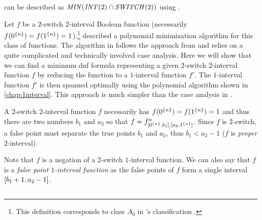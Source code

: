 can be described as
$\mathit{MIN} (\mathit{INT} (2) \cap \mathit{SWITCH} (2))$
using
.

Let $f$ be a $2$-switch $2$-interval Boolean function
(necessarily $f(0^{\{n\}}) = f(1^{\{n\}})
= 1$).\footnote{This definition corresponds to class $A_0$
in \citeauthor{Dubovsky2012}'s classification
\citep[p.~5]{Dubovsky2012}.}
\citeauthor{Dubovsky2012} described a polynomial minimization algorithm for this class of functions.
The algorithm in \citet[p.~17]{Dubovsky2012}
follows the approach from \citet{Schieber2005154}
and relies on a quite complicated and technically involved case analysis.
Here we will show that we can find a minimum \acrshort{dnf} formula representing a given $2$-switch $2$-interval function $f$ by reducing the function to a $1$-interval function $f'$.
The $1$-interval function $f'$ is then spanned optimally
using the polynomial algorithm
shown in \cref{chap:1interval}.
This approach is much simpler
than the case analysis in \citet{Dubovsky2012}.

A $2$-switch $2$-interval function $f$ necessarily has $f(0^{\{n\}})=f(1^{\{n\}})=1$
and thus there are two numbers $b_1$ and $a_2$
so that $f = f^{n}_{[0^{\{n\}}, b_1], [a_2, 1^{\{n\}}]}$.
Since $f$ is $2$-switch,
a false point must separate the true points $b_1$ and $a_2$,
thus $b_1 < a_2-1$
($f$ is \emph{proper} $2$-interval).

Note that $f$ is a negation of a $2$-switch $1$-interval function.
We can also say that $f$ is a \emph{false point $1$-interval function}
as the false points of $f$ form a single interval
$[b_1+1, a_2-1]$.

\subsection{\algdesctitle}

